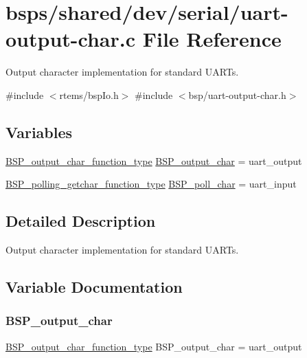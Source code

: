 \hypertarget{uart-output-char_8c}{}\section{bsps/shared/dev/serial/uart-\/output-\/char.c File Reference}
\label{uart-output-char_8c}


Output character implementation for standard U\+A\+R\+Ts.  


{\ttfamily \#include $<$rtems/bsp\+Io.\+h$>$}\newline
{\ttfamily \#include $<$bsp/uart-\/output-\/char.\+h$>$}\newline
\subsection*{Variables}
\begin{DoxyCompactItemize}
\item 
\mbox{\hyperlink{bspIo_8h_a0b0dff1c3d35110ae303b4098c60dc14}{B\+S\+P\+\_\+output\+\_\+char\+\_\+function\+\_\+type}} \mbox{\hyperlink{uart-output-char_8c_a5fb8c9c4f076f0340b4a17ed432ced5c}{B\+S\+P\+\_\+output\+\_\+char}} = uart\+\_\+output
\item 
\mbox{\hyperlink{bspIo_8h_a132b9ceff428a634ece5dfaac7ef1006}{B\+S\+P\+\_\+polling\+\_\+getchar\+\_\+function\+\_\+type}} \mbox{\hyperlink{uart-output-char_8c_ae5846eecdfa8f2813504371bf01c29b0}{B\+S\+P\+\_\+poll\+\_\+char}} = uart\+\_\+input
\end{DoxyCompactItemize}


\subsection{Detailed Description}
Output character implementation for standard U\+A\+R\+Ts. 



\subsection{Variable Documentation}
\mbox{\label{uart-output-char_8c_a5fb8c9c4f076f0340b4a17ed432ced5c}} 
\subsubsection{\texorpdfstring{BSP\_output\_char}{BSP\_output\_char}}
{\footnotesize\ttfamily \mbox{\hyperlink{bspIo_8h_a0b0dff1c3d35110ae303b4098c60dc14}{B\+S\+P\+\_\+output\+\_\+char\+\_\+function\+\_\+type}} B\+S\+P\+\_\+output\+\_\+char = uart\+\_\+output}

